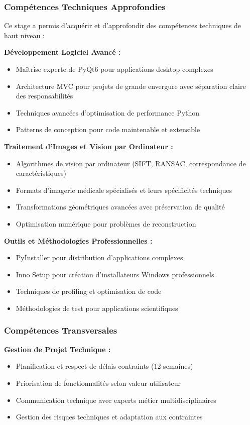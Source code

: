 \documentclass[12pt,a4paper]{article}
\begin{document}
\subsubsection{Compétences Techniques Approfondies}

Ce stage a permis d'acquérir et d'approfondir des compétences techniques de haut niveau :

\textbf{Développement Logiciel Avancé :}
\begin{itemize}
\item Maîtrise experte de PyQt6 pour applications desktop complexes
\item Architecture MVC pour projets de grande envergure avec séparation claire des responsabilités
\item Techniques avancées d'optimisation de performance Python
\item Patterns de conception pour code maintenable et extensible
\end{itemize}

\textbf{Traitement d'Images et Vision par Ordinateur :}
\begin{itemize}
\item Algorithmes de vision par ordinateur (SIFT, RANSAC, correspondance de caractéristiques)
\item Formats d'imagerie médicale spécialisés et leurs spécificités techniques
\item Transformations géométriques avancées avec préservation de qualité
\item Optimisation numérique pour problèmes de reconstruction
\end{itemize}

\textbf{Outils et Méthodologies Professionnelles :}
\begin{itemize}
\item PyInstaller pour distribution d'applications complexes
\item Inno Setup pour création d'installateurs Windows professionnels
\item Techniques de profiling et optimisation de code
\item Méthodologies de test pour applications scientifiques
\end{itemize}

\subsubsection{Compétences Transversales}

\textbf{Gestion de Projet Technique :}
\begin{itemize}
\item Planification et respect de délais contraints (12 semaines)
\item Priorisation de fonctionnalités selon valeur utilisateur
\item Communication technique avec experts métier multidisciplinaires
\item Gestion des risques techniques et adaptation aux contraintes
\end{itemize}
\end{document}
